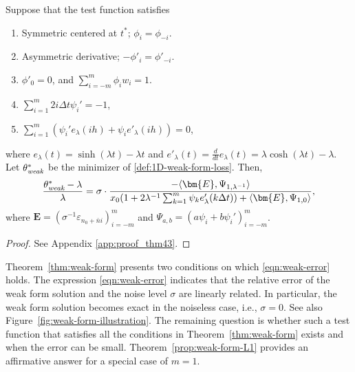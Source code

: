 \documentclass[final]{siamltex}
\begin{document}
\begin{theorem} \label{thm:weak-form}
    Suppose that the test function satisfies 
    \begin{enumerate}
        \item Symmetric centered at $t^*$; $\phi_i = \phi_{-i}$.
        \item Asymmetric derivative; $-\phi'_i = \phi'_{-i}$.
        \item $\phi'_0 = 0$, and $\sum_{i=-m}^m \phi_iw_i = 1$.
        \item $\sum_{i=1}^m 2i\Delta t\psi_i' = -1$,
        \item $\sum_{i=1}^m \left(\psi_i'e_\lambda(ih)  + \psi_i e'_\lambda(ih)\right) = 0$,
    \end{enumerate}
    where $e_\lambda(t) = \sinh(\lambda t) - \lambda t$
    and $e'_\lambda(t) = \frac{d}{dt}e_\lambda(t) = \lambda \cosh(\lambda t)-\lambda$.
    Let $\theta^*_\emph{\text{weak}}$ be the minimizer of \eqref{def:1D-weak-form-loss}. 
    Then, 
    \begin{equation} \label{eqn:weak-error}
        \frac{\theta^*_\emph{\text{weak}} - \lambda}{\lambda} = \sigma \cdot \frac{-\langle \bm{E}, \Psi_{1,\lambda^{-1}}\rangle
        }{x_0(1 + 2\lambda^{-1}\sum_{k=1}^{m} \psi_k e'_\lambda(k\Delta t)) + \langle \bm{E}, \Psi_{1, 0}\rangle},
    \end{equation}
    where $\bm{E}= (\sigma^{-1}\varepsilon_{n_0+\bar{n}i})_{i=-m}^m$
    and $\Psi_{a,b} = (a\psi_i + b\psi_i')_{i=-m}^m$.
\end{theorem}
\begin{proof}
    See Appendix \ref{app:proof_thm43}.
\end{proof}


Theorem~\ref{thm:weak-form} presents two conditions on which \eqref{eqn:weak-error} holds.
The expression \eqref{eqn:weak-error} indicates that the relative error of the weak form solution and the noise level $\sigma$ are linearly related. In particular, the weak form solution becomes exact in the noiseless case, i.e., $\sigma=0$. See also Figure~\ref{fig:weak-form-illustration}.
The remaining question is whether such a test function that satisfies all the conditions in Theorem~\ref{thm:weak-form} exists and when the error can be small.
Theorem~\ref{prop:weak-form-L1} provides an affirmative answer for a special case of $m=1$.
\end{document}
